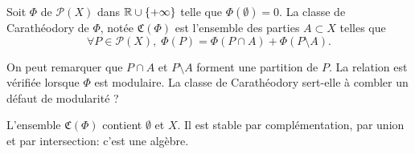 \begin{defin}\label{Def:ClasseCaratheodory}
 Soit $\Phi$ de $\mathcal{P}(X)$ dans $\mathbb{R} \cup \left\lbrace + \infty \right\rbrace$ telle que $\Phi(\emptyset) = 0$. La classe de Carathéodory de $\Phi$, notée $\mathfrak{C}(\Phi)$ est l'ensemble des parties $A\subset X$ telles que
 \begin{displaymath}
  \forall P \in \mathcal{P}(X), \; \Phi(P) = \Phi(P \cap A) + \Phi(P \setminus A).
 \end{displaymath}
\end{defin}
On peut remarquer que $P\cap A$ et $P \setminus A$ forment une partition de $P$. La relation est vérifiée lorsque $\Phi$ est modulaire. La classe de Carathéodory sert-elle à combler un défaut de modularité ?
\begin{propn}
 L'ensemble $\mathfrak{C}(\Phi)$ contient $\emptyset$ et $X$. Il est stable par complémentation, par union et par intersection: c'est une algèbre.
\end{propn}
